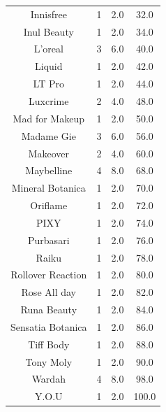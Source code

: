 \documentclass{article}
\begin{document}
\begin{longtable}{|c|c|c|c|}
    Innisfree         & 1                  & 2.0                 & 32.0                           \\
    Inul Beauty       & 1                  & 2.0                 & 34.0                           \\
    L'oreal           & 3                  & 6.0                 & 40.0                           \\
    Liquid            & 1                  & 2.0                 & 42.0                           \\
    LT Pro            & 1                  & 2.0                 & 44.0                           \\
    Luxcrime          & 2                  & 4.0                 & 48.0                           \\
    Mad for Makeup    & 1                  & 2.0                 & 50.0                           \\
    Madame Gie        & 3                  & 6.0                 & 56.0                           \\
    Makeover          & 2                  & 4.0                 & 60.0                           \\
    Maybelline        & 4                  & 8.0                 & 68.0                           \\
    Mineral Botanica  & 1                  & 2.0                 & 70.0                           \\
    Oriflame          & 1                  & 2.0                 & 72.0                           \\
    PIXY              & 1                  & 2.0                 & 74.0                           \\
    Purbasari         & 1                  & 2.0                 & 76.0                           \\
    Raiku             & 1                  & 2.0                 & 78.0                           \\
    Rollover Reaction & 1                  & 2.0                 & 80.0                           \\
    Rose All day      & 1                  & 2.0                 & 82.0                           \\
    Runa Beauty       & 1                  & 2.0                 & 84.0                           \\
    Sensatia Botanica & 1                  & 2.0                 & 86.0                           \\
    Tiff Body         & 1                  & 2.0                 & 88.0                           \\
    Tony Moly         & 1                  & 2.0                 & 90.0                           \\
    Wardah            & 4                  & 8.0                 & 98.0                           \\
    Y.O.U             & 1                  & 2.0                 & 100.0                          \\
\end{longtable}
\end{document}
